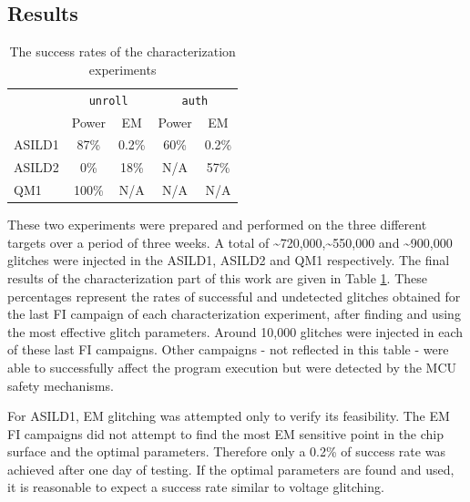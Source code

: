 \documentclass[a4paper, 10pt]{IEEEtran}
\newcommand{\TI}{ASILD1\xspace}
\newcommand{\ST}{ASILD2\xspace}
\newcommand{\NXP}{QM1\xspace}
\newcommand{\unroll}{\texttt{unroll}\xspace}
\newcommand{\auth}{\texttt{auth}\xspace}
\begin{document}
\subsection{Results}
\begin{table}[htb]
\caption{The success rates of the characterization experiments} 
\label{tab:char-experiments}
\centering
\begin{tabular}{l cc cc}
\toprule
         & \multicolumn{2}{c}{\unroll}  
         & \multicolumn{2}{c}{\auth}       \\
           
           \cmidrule(lr){2-3}  \cmidrule(lr){4-5}        
         
         & \multicolumn{1}{c}{Power}                        & \multicolumn{1}{c}{EM}  
         & \multicolumn{1}{c}{Power}                        & \multicolumn{1}{c}{EM}                              
               \\
        \cmidrule(lr){1-5}
\TI      & 87\%   
         & 0.2\%      
         & 60\%   
         & 0.2\%      
         \\
\ST 
         & 0\%                  
         & 18\%                
         & N/A      
         & 57\%                 
         \\
\NXP 
         & 100\%                  
         & N/A               
         & N/A      
         & N/A                 
         \\
\bottomrule
\end{tabular}
\end{table}
These two experiments were prepared and performed on the three different targets over a period of three weeks. A total of \textasciitilde720,000,\textasciitilde550,000 and \textasciitilde900,000 glitches were injected in the \TI, \ST and \NXP respectively. The final results of the characterization part of this work are given in Table \ref{tab:char-experiments}. These percentages represent the rates of successful and undetected glitches obtained for the last FI campaign of each characterization experiment, after finding and using the most effective glitch parameters. Around 10,000 glitches were injected in each of these last FI campaigns. Other campaigns - not reflected in this table - were able to successfully affect   the program execution but were detected by the MCU safety mechanisms. 

For \TI, EM glitching was attempted only to verify its feasibility. The EM FI campaigns did not attempt to find the most EM sensitive point in the chip surface and the optimal parameters. Therefore only a 0.2\% of success rate was achieved after one day of testing. If the optimal parameters are found and used, it is reasonable to expect a success rate similar to voltage glitching.
\end{document}
